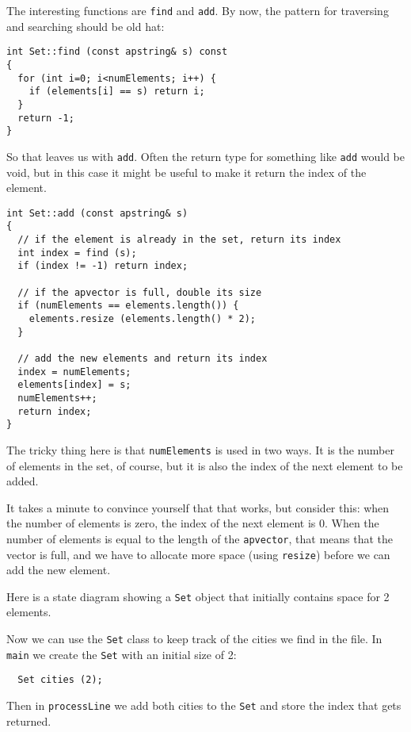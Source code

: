 
The interesting functions are {\tt find} and {\tt add}.  By
now, the pattern for traversing and searching should be old
hat:

\begin{verbatim}
int Set::find (const apstring& s) const
{
  for (int i=0; i<numElements; i++) {
    if (elements[i] == s) return i;
  }
  return -1;
}
\end{verbatim}
%
So that leaves us with {\tt add}.  Often the return type for
something like {\tt add} would be void, but in this case it
might be useful to make it return the index of the element.

\begin{verbatim}
int Set::add (const apstring& s)
{
  // if the element is already in the set, return its index
  int index = find (s);
  if (index != -1) return index;

  // if the apvector is full, double its size
  if (numElements == elements.length()) {
    elements.resize (elements.length() * 2);
  }

  // add the new elements and return its index
  index = numElements;
  elements[index] = s;
  numElements++;
  return index;
}
\end{verbatim}
%
The tricky thing here is that {\tt numElements} is used in
two ways.  It is the number of elements in the set, of course,
but it is also the index of the next element to be added.

It takes a minute to convince yourself that that works, but
consider this: when the number of elements is zero, the index
of the next element is 0.  When the number of elements is
equal to the length of the {\tt apvector}, that means that the
vector is full, and we have to allocate more space (using
{\tt resize}) before we can add the new element.


Here is a state diagram showing a {\tt Set} object that
initially contains space for 2 elements.

\vspace {0.1in}
\centerline{}
\vspace {0.1in}

Now we can use the {\tt Set} class to keep track of the cities
we find in the file.  In {\tt main} we create the {\tt Set} with
an initial size of 2:

\begin{verbatim}
  Set cities (2);
\end{verbatim}
%
Then in {\tt processLine} we add both cities to the {\tt Set}
and store the index that gets returned.

